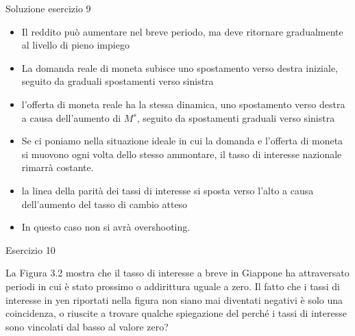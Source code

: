 \ifshowsolution

\begin{frame}{Soluzione esercizio 9}
\protect\hypertarget{soluzione-esercizio-9}{}

\begin{itemize}
\item
  Il reddito può aumentare nel breve periodo, ma deve ritornare
  gradualmente al livello di pieno impiego
\item
  La domanda reale di moneta subisce uno spostamento verso destra
  iniziale, seguito da graduali spostamenti verso sinistra
\item
  l'offerta di moneta reale ha la stessa dinamica, uno spostamento verso
  destra a causa dell'aumento di \(M^s\), seguito da spostamenti
  graduali verso sinistra
\end{itemize}

\end{frame}

\begin{frame}{}
\protect\hypertarget{section}{}

\begin{itemize}
\item
  Se ci poniamo nella situazione ideale in cui la domanda e l'offerta di
  moneta si muovono ogni volta dello stesso ammontare, il tasso di
  interesse nazionale rimarrà costante.
\item
  la linea della parità dei tassi di interesse si sposta verso l'alto a
  causa dell'aumento del tasso di cambio atteso
\item
  In questo caso non si avrà overshooting.
\end{itemize}

\end{frame}

\fi

\begin{frame}{Esercizio 10}
\protect\hypertarget{esercizio-10}{}

La Figura 3.2 mostra che il tasso di interesse a breve in Giappone ha
attraversato periodi in cui è stato prossimo o addirittura uguale a
zero. Il fatto che i tassi di interesse in yen riportati nella figura
non siano mai diventati negativi è solo una coincidenza, o riuscite a
trovare qualche spiegazione del perché i tassi di interesse sono
vincolati dal basso al valore zero?

\end{frame}

\ifshowsolution

